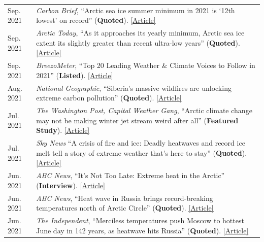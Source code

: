 \documentclass[margin,line,palatino,courier,10pt]{res}
\begin{document}
\begin{resume}
\begin{tabular}{@{}p{0.9in}p{4in}}
Sep. 2021 & \textit{Carbon Brief}, ``Arctic sea ice summer minimum in 2021 is `12th lowest' on record'' (\textbf{Quoted}). \href{https://www.carbonbrief.org/arctic-sea-ice-summer-minimum-in-2021-is-12th-lowest-on-record}{[Article]}\\
Sep. 2021 & \textit{Arctic Today}, ``As it approaches its yearly minimum, Arctic sea ice extent its slightly greater than recent ultra-low years'' (\textbf{Quoted}). \href{https://www.arctictoday.com/as-it-approaches-its-yearly-minimum-arctic-sea-ice-extent-its-slightly-greater-than-recent-ultra-low-years/}{[Article]}\\
Sep. 2021 & \textit{BreezoMeter}, ``Top 20 Leading Weather \& Climate Voices to Follow in 2021'' (\textbf{Listed}). \href{https://blog.breezometer.com/leading-weather-climate-voices-to-follow}{[Article]}\\
Aug. 2021 & \textit{National Geographic}, ``Siberia’s massive wildfires are unlocking extreme carbon pollution'' (\textbf{Quoted}). \href{https://www.nationalgeographic.com/environment/article/siberias-massive-wildfires-are-unlocking-extreme-carbon-pollution}{[Article]}\\
Jul. 2021 & \textit{The Washington Post, Capital Weather Gang}, ``Arctic climate change may not be making winter jet stream weird after all'' (\textbf{Featured Study}). \href{https://www.washingtonpost.com/weather/2021/07/31/arctic-climate-change-jetstream-winter/}{[Article]}\\
Jul. 2021 & \textit{Sky News} ``A crisis of fire and ice: Deadly heatwaves and record ice melt tell a story of extreme weather that’s here to stay'' (\textbf{Quoted}). \href{https://news.sky.com/story/climate-change-as-fire-rages-across-the-us-and-canada-ice-retreats-off-the-coast-of-siberia-12359277}{[Article]}\\
Jun. 2021 & \textit{ABC News}, ``It’s Not Too Late: Extreme heat in the Arctic'' (\textbf{Interview}). \href{https://abcnews.go.com/International/video/late-extreme-heat-arctic-78501037}{[Article]}\\
Jun. 2021 & \textit{ABC News}, ``Heat wave in Russia brings record-breaking temperatures north of Arctic Circle'' (\textbf{Quoted}). \href{https://abcnews.go.com/International/heat-wave-russia-brings-record-breaking-temperatures-north/story?id=78446355}{[Article]}\\
Jun. 2021 & \textit{The Independent}, ``Merciless temperatures push Moscow to hottest June day in 142 years, as heatwave hits Russia'' (\textbf{Quoted}). \href{https://www.independent.co.uk/climate-change/news/moscow-record-temperature-arctic-heatwave-b1871351.html}{[Article]}\\

\end{tabular}
\end{resume}
\end{document}
